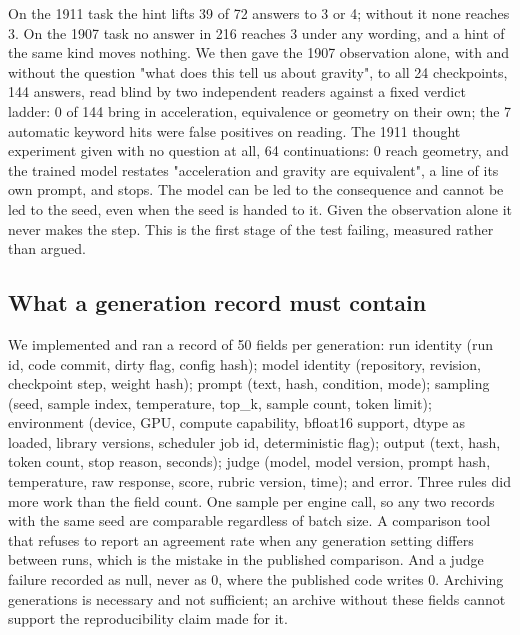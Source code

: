 On the 1911 task the hint lifts 39 of 72 answers to 3 or 4; without it none reaches 3. On the 1907 task no answer in 216 reaches 3 under any wording, and a hint of the same kind moves nothing. We then gave the 1907 observation alone, with and without the question "what does this tell us about gravity", to all 24 checkpoints, 144 answers, read blind by two independent readers against a fixed verdict ladder: 0 of 144 bring in acceleration, equivalence or geometry on their own; the 7 automatic keyword hits were false positives on reading. The 1911 thought experiment given with no question at all, 64 continuations: 0 reach geometry, and the trained model restates "acceleration and gravity are equivalent", a line of its own prompt, and stops. The model can be led to the consequence and cannot be led to the seed, even when the seed is handed to it. Given the observation alone it never makes the step. This is the first stage of the test failing, measured rather than argued.



\subsection{What a generation record must contain}

We implemented and ran a record of 50 fields per generation: run identity (run id, code commit, dirty flag, config hash); model identity (repository, revision, checkpoint step, weight hash); prompt (text, hash, condition, mode); sampling (seed, sample index, temperature, top\_k, sample count, token limit); environment (device, GPU, compute capability, bfloat16 support, dtype as loaded, library versions, scheduler job id, deterministic flag); output (text, hash, token count, stop reason, seconds); judge (model, model version, prompt hash, temperature, raw response, score, rubric version, time); and error. Three rules did more work than the field count. One sample per engine call, so any two records with the same seed are comparable regardless of batch size. A comparison tool that refuses to report an agreement rate when any generation setting differs between runs, which is the mistake in the published comparison. And a judge failure recorded as null, never as 0, where the published code writes 0. Archiving generations is necessary and not sufficient; an archive without these fields cannot support the reproducibility claim made for it.


